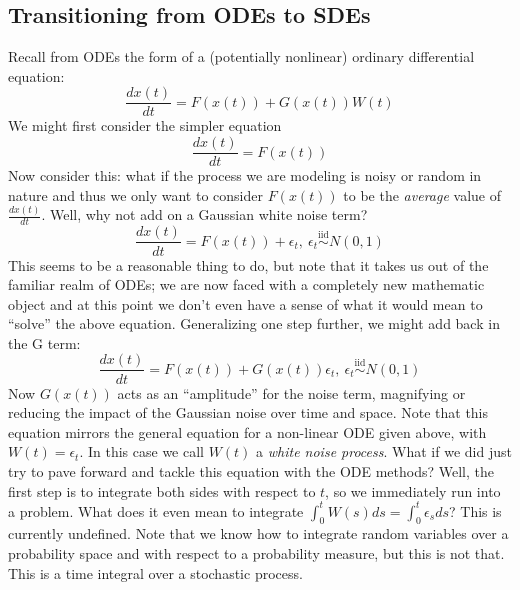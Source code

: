 \documentclass[12pt]{article}
\begin{document}
\subsection{Transitioning from ODEs to SDEs}
Recall from ODEs the form of a (potentially nonlinear) ordinary differential equation: 
\[\frac{dx(t)}{dt} = F(x(t)) + G(x(t)) W(t)\]
We might first consider the simpler equation 
\[\frac{dx(t)}{dt} = F(x(t))\]
Now consider this: what if the process we are modeling is noisy or random in nature and thus we only want to consider $F(x(t))$ to be the 
\textit{average} value of $\frac{dx(t)}{dt}$. Well, why not add on a Gaussian white noise term? 
 \[\frac{dx(t)}{dt} = F(x(t)) + \epsilon_t, \ \epsilon_t \overset{\text{iid}}{\sim} N(0, 1)\]
This seems to be a reasonable thing to do, but note that it takes us out of the familiar realm of ODEs; we are now faced with a completely new mathematic object and 
at this point we don't even have a sense of what it would mean to ``solve'' the above equation. Generalizing one step further, we might add back in the G term: 
 \[\frac{dx(t)}{dt} = F(x(t)) + G(x(t))\epsilon_t, \ \epsilon_t \overset{\text{iid}}{\sim} N(0, 1)\]
 Now $G(x(t))$ acts as an ``amplitude'' for the noise term, magnifying or reducing the impact of the Gaussian noise over time and space. Note that this equation 
 mirrors the general equation for a non-linear ODE given above, with $W(t) = \epsilon_t$. In this case we call $W(t)$ a \textit{white noise process}. What if we did just 
 try to pave forward and tackle this equation with the ODE methods? Well, the first step is to integrate both sides with respect to $t$, so we immediately run into a problem. 
 What does it even mean to integrate $\int_{0}^{t} W(s) ds = \int_{0}^{t} \epsilon_{s} ds$? This is currently undefined. Note that we know how to integrate random variables 
 over a probability space and with respect to a probability measure, but this is not that. This is a time integral over a stochastic process.
 
\end{document}
